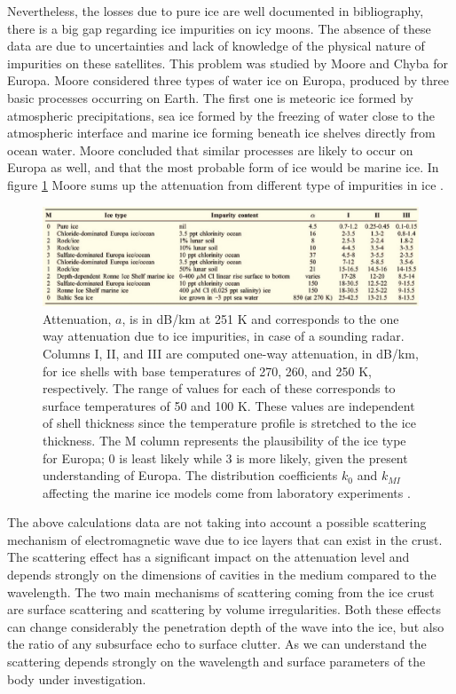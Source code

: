 Nevertheless, the losses due to pure ice are well documented in bibliography, there is a big gap regarding ice impurities on icy moons. The absence of these data are due to uncertainties and lack of knowledge of the physical nature of impurities on these satellites. This problem was studied by  Moore \cite{Moore_2000} and Chyba \cite{Chyba_1998} for Europa. Moore considered three types of water ice on Europa, produced by three basic processes occurring on Earth. The first one is meteoric ice formed by atmospheric precipitations, sea ice formed by the freezing of water close to the atmospheric interface and marine ice forming beneath ice shelves directly from ocean water. Moore concluded that similar processes are likely to occur on Europa as well, and that the most probable form of ice would be marine ice. In figure \ref{fig:impurities} Moore sums up the attenuation from different type of impurities in ice \cite{Moore_2000}.

\begin{figure}[htb]
\centering
\includegraphics[width=1\textwidth]{figures/Moore2.jpg}
\caption{Attenuation, $a$, is in dB/km at 251 K and corresponds to the one way attenuation due to  ice impurities, in case of a sounding radar. Columns I, II, and III are computed one-way attenuation, in dB/km, for ice shells with base temperatures of 270, 260, and 250 K, respectively. The range of values for each of these corresponds to surface temperatures of 50 and 100 K. These values are independent of shell thickness since the temperature profile is stretched to the ice thickness. The M column represents the plausibility of the ice type for Europa; 0 is least likely while 3 is more likely, given the present understanding
of Europa. The distribution coefficients $k_{0}$ and $k_{MI}$ affecting the marine ice models come from laboratory experiments \cite{Moore_2000}.}
\label{fig:impurities}
\end{figure}
The above calculations data are not taking into account a possible scattering mechanism of electromagnetic wave due to ice layers that can exist in the crust. The scattering effect has a significant impact on the attenuation level and depends strongly on the dimensions of cavities in the medium compared to the wavelength. The two main mechanisms of scattering coming from the ice crust are surface scattering and scattering by volume irregularities. Both these effects can change considerably the penetration depth of the wave into the ice, but also the ratio of any subsurface echo to surface clutter. As we can understand the scattering depends strongly on the wavelength and surface parameters of the body under investigation. 


